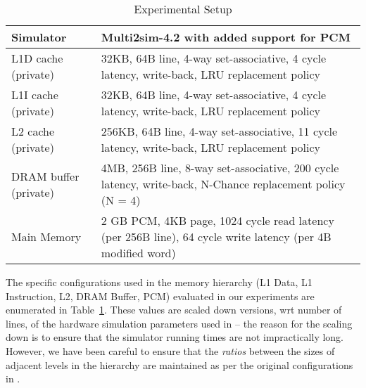 \begin{center}
\begin{table}[htbp]
\begin{small}
\caption{Experimental Setup}
\label{table:setup}
\begin{tabular}{p{2.5cm}p{10cm}}
\toprule
Simulator & Multi2sim-4.2 with added support for PCM\\ \hline

L1D cache (private) & 32KB, 64B line, 4-way set-associative, 4 cycle latency, write-back, LRU replacement policy\\ \hline
L1I cache (private) & 32KB, 64B line, 4-way set-associative, 4 cycle latency, write-back, LRU replacement policy\\ \hline   
L2 cache (private) & 256KB, 64B line, 4-way set-associative, 11 cycle latency, write-back, LRU replacement policy\\ \hline

DRAM buffer (private) & 4MB, 256B line, 8-way set-associative, 200 cycle latency, write-back, N-Chance replacement policy (N = 4)\\ \hline

Main Memory & 2 GB PCM, 4KB page, 1024 cycle read latency (per 256B line), 64 cycle write latency (per 4B modified word)\\
\bottomrule
\end{tabular}
\end{small}
\end{table}
\end{center}


The specific configurations used in the memory hierarchy (L1 Data,
L1 Instruction, L2, DRAM Buffer, PCM) evaluated in our experiments are
enumerated in Table~\ref{table:setup}.  These values are scaled down
versions, wrt number of lines, of the hardware simulation parameters used
in \cite{wear} -- the reason for the scaling down is to ensure that the
simulator running times are not impractically long. However, we have been
careful to ensure that the \emph{ratios} between the sizes of adjacent
levels in the hierarchy are maintained as per the original configurations
in \cite{wear}.  
\begin{comment}
Further, note that the read-to-write latency ratio is
1:4, significantly lower than the 1:20 of Table ~\ref{tab:tab_pcm_char}
in the Introduction. We wish to point out that this makes our results
\emph{conservative} -- if the ratio is made 1:20, the performance
improvements of the new algorithms  are even more substantial.
\end{comment}

